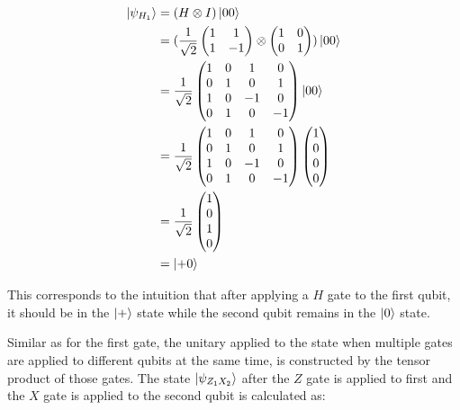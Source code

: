 \begin{align}
  \Ket{\psi_{H_1}}  &= (H \otimes I) \Ket{00} \\
                   &= (\frac{1}{\sqrt{2}} \begin{pmatrix} 1 & 1 \\ 1 & -1 \end{pmatrix} \otimes \begin{pmatrix} 1 & 0 \\ 0 & 1 \end{pmatrix}) \Ket{00} \\
                    &= \frac{1}{\sqrt{2}} \begin{pmatrix} 1 & 0 & 1 & 0 \\ 0 & 1 & 0 & 1 \\ 1 & 0 & -1 & 0 \\ 0 & 1 & 0 & -1 \end{pmatrix} \Ket{00} \\
                    &= \frac{1}{\sqrt{2}} \begin{pmatrix} 1 & 0 & 1 & 0 \\ 0 & 1 & 0 & 1 \\ 1 & 0 & -1 & 0 \\ 0 & 1 & 0 & -1 \end{pmatrix} \begin{pmatrix} 1 \\ 0 \\ 0 \\ 0 \end{pmatrix} \\
                    &= \frac{1}{\sqrt{2}} \begin{pmatrix} 1 \\ 0 \\ 1 \\ 0 \end{pmatrix} \\
                    &= \Ket{+0}
\end{align}

This corresponds to the intuition that after applying a $H$ gate to the first
qubit, it should be in the $\Ket{+}$ state while the second qubit remains in
the $\Ket{0}$ state.

Similar as for the first gate, the unitary applied to the state when multiple
gates are applied to different qubits at the same time, is constructed by the
tensor product of those gates. The state $\Ket{\psi_{Z_1X_2}}$ after the $Z$
gate is applied to first and the $X$ gate is applied to the second qubit is
calculated as:

